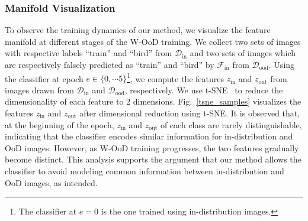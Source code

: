 \documentclass[10pt,twocolumn,letterpaper]{article}
\begin{document}
\subsubsection{Manifold Visualization}
\vspace{-0.4em}
To observe the training dynamics of our method, we visualize the feature manifold at different stages of the W-OoD training. 
We collect two sets of images with respective labels ``train'' and ``bird'' from $\mathcal{D}_\text{in}$ and two sets of images which are respectively falsely predicted as ``train'' and ``bird'' by $\mathcal{F}_\text{in}$ from $\mathcal{D}_\text{ood}$.
Using the classifier at epoch $e\in\{0,\cdots5\}$\footnote{The classifier at $e=0$ is the one trained using in-distribution images.}, we compute the features $z_\text{in}$ and $z_\text{out}$ from images drawn from $\mathcal{D}_\text{in}$ and $\mathcal{D}_\text{ood}$, respectively.
We use t-SNE~\cite{maaten2008visualizing} to reduce the dimensionality of each feature to 2 dimensions.
Fig.~\ref{tsne_samples} visualizes the features $z_\text{in}$ and $z_\text{out}$ after dimensional reduction using t-SNE. 
It is observed that, at the beginning of the epoch, $z_\text{in}$ and $z_\text{out}$ of each class are rarely distinguishable, indicating that the classifier encodes similar information for in-distribution and OoD images. However, as W-OoD training progresses, the two features gradually become distinct.
This analysis supports the argument that our method allows the classifier to avoid modeling common information between in-distribution and OoD images, as intended.























\vspace{-0.5em}
\end{document}

